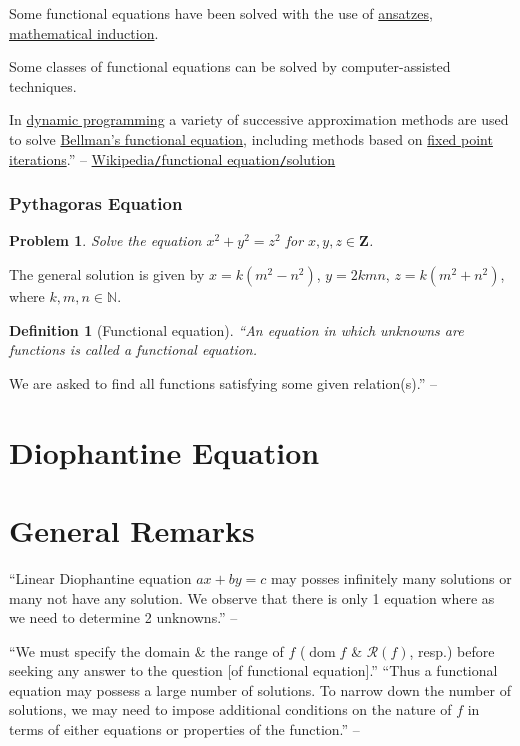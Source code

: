 \documentclass{article}
\newtheorem{definition}{Definition}
\newtheorem{problem}{Problem}
\begin{document}
Some functional equations have been solved with the use of \href{https://en.wikipedia.org/wiki/Ansatz}{ansatzes}, \href{https://en.wikipedia.org/wiki/Mathematical_induction}{mathematical induction}.

Some classes of functional equations can be solved by computer-assisted techniques.

In \href{https://en.wikipedia.org/wiki/Dynamic_programming}{dynamic programming} a variety of successive approximation methods are used to solve \href{https://en.wikipedia.org/wiki/Bellman_equation}{Bellman's functional equation}, including methods based on \href{https://en.wikipedia.org/wiki/Fixed_point_iteration}{fixed point iterations}.'' -- \href{https://en.wikipedia.org/wiki/Functional_equation#Solution}{Wikipedia\texttt{/}functional equation\texttt{/}solution}

\subsubsection{Pythagoras Equation}

\begin{problem}
	Solve the equation $x^2 + y^2 = z^2$ for $x,y,z\in\mathbf{Z}$.
\end{problem}
The general solution is given by $x = k(m^2 - n^2)$, $y = 2kmn$, $z = k(m^2 + n^2)$, where $k,m,n\in\mathbb{N}$.

\begin{definition}[Functional equation]
	``An equation in which unknowns are functions is called a \emph{functional equation}.
\end{definition}
We are asked to find all functions satisfying some given relation(s).'' -- \cite[p. 2]{Venkatachala2013}

\section{Diophantine Equation}

\section{General Remarks}
``Linear Diophantine equation $ax + by = c$ may posses infinitely many solutions or many not have any solution. We observe that there is only 1 equation where as we need to determine 2 unknowns.'' -- \cite[p. 1]{Venkatachala2013}

``We must specify the domain \& the range of $f$ ($\operatorname{dom}f$ \& $\mathcal{R}(f)$, resp.) before seeking any answer to the question [of functional equation].'' ``Thus a functional equation may possess a large number of solutions. To narrow down the number of solutions, we may need to impose additional conditions on the nature of $f$ in terms of either equations or properties of the function.'' -- \cite[p. 2]{Venkatachala2013}
\end{document}
